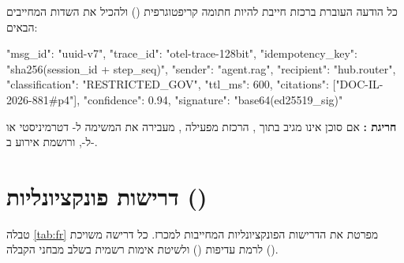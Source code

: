 \begin{contractbox}
כל הודעה העוברת ברכזת חייבת להיות חתומה קריפטוגרפית () ולהכיל את השדות המחייבים הבאים:
\begin{ltrcode}
{
  "msg_id": "uuid-v7",
  "trace_id": "otel-trace-128bit",
  "idempotency_key": "sha256(session_id + step_seq)",
  "sender": "agent.rag",
  "recipient": "hub.router",
  "classification": "RESTRICTED_GOV",
  "ttl_ms": 600,
  "citations": ["DOC-IL-2026-881#p4"],
  "confidence": 0.94,
  "signature": "base64(ed25519_sig)"
}
\end{ltrcode}
\textbf{חריגת :} אם סוכן אינו מגיב בתוך , הרכזת מפעילה , מעבירה את המשימה ל- דטרמיניסטי או ל-, ורושמת אירוע ב-.
\end{contractbox}

\section{דרישות פונקציונליות ()}
\label{sec:fr}

טבלה \ref{tab:fr} מפרטת את הדרישות הפונקציונליות המחייבות למכרז. כל דרישה משויכת לרמת עדיפות () ולשיטת אימות רשמית בשלב מבחני הקבלה ().

